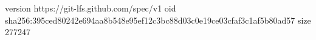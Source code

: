 version https://git-lfs.github.com/spec/v1
oid sha256:395ced80242e694aa8b548e95ef12c3bc88d03c0e19ce03cfaf3c1af5b80ad57
size 277247
